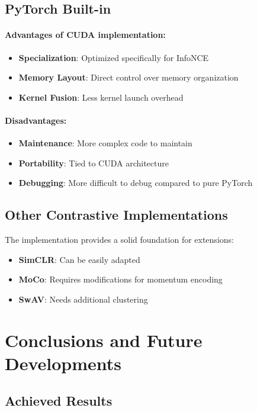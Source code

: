 \documentclass[a4paper,11pt]{article}
\begin{document}
\subsection{PyTorch Built-in}

\paragraph{Advantages of CUDA implementation:}
\begin{itemize}
    \item \textbf{Specialization}: Optimized specifically for InfoNCE
    \item \textbf{Memory Layout}: Direct control over memory organization
    \item \textbf{Kernel Fusion}: Less kernel launch overhead
\end{itemize}

\paragraph{Disadvantages:}
\begin{itemize}
    \item \textbf{Maintenance}: More complex code to maintain
    \item \textbf{Portability}: Tied to CUDA architecture
    \item \textbf{Debugging}: More difficult to debug compared to pure PyTorch
\end{itemize}

\subsection{Other Contrastive Implementations}

The implementation provides a solid foundation for extensions:
\begin{itemize}
    \item \textbf{SimCLR}: Can be easily adapted
    \item \textbf{MoCo}: Requires modifications for momentum encoding
    \item \textbf{SwAV}: Needs additional clustering
\end{itemize}

\section{Conclusions and Future Developments}

\subsection{Achieved Results}
\end{document}
